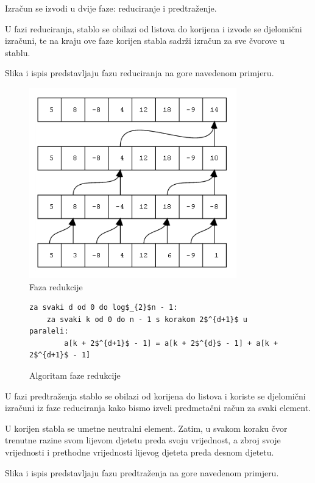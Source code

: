 \documentclass[times, utf8, zavrsni, numeric]{fer}
\begin{document}
Izračun se izvodi u dvije faze: reduciranje i predtraženje.

U fazi reduciranja, stablo se obilazi od listova do korijena i izvode se djelomični izračuni, te na kraju ove faze korijen stabla sadrži izračun za sve čvorove u stablu.

Slika i ispis predstavljaju fazu reduciranja na gore navedenom primjeru.

\begin{figure}[ht!]
\centering
\includegraphics[width=90mm]{redukcija.png}
\caption{Faza redukcije}
\label{redukcija}
\end{figure}

\begin{figure}[hbt]
\begin{singlespace}
\begin{lstlisting}[label={reduciranje}]
za svaki d od 0 do log$_{2}$n - 1:
	za svaki k od 0 do n - 1 s korakom 2$^{d+1}$ u paraleli:
		a[k + 2$^{d+1}$ - 1] = a[k + 2$^{d}$ - 1] + a[k + 2$^{d+1}$ - 1]
\end{lstlisting}
\end{singlespace}
\caption{Algoritam faze redukcije}
\label{redukcijaalgoritam}
\end{figure}

U fazi predtraženja stablo se obilazi od korijena do listova i koriste se djelomični izračuni iz faze reduciranja kako bismo izveli predmetačni račun za svaki element.

U korijen stabla se umetne neutralni element. Zatim, u svakom koraku čvor trenutne razine svom lijevom djetetu preda svoju vrijednost, a zbroj svoje vrijednosti i prethodne vrijednosti lijevog djeteta preda desnom djetetu.

Slika i ispis predstavljaju fazu predtraženja na gore navedenom primjeru.
\pagebreak
\end{document}
